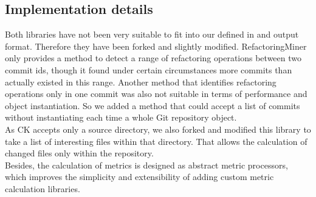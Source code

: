 \subsection{Implementation details}
Both libraries have not been very suitable to fit into our defined in and output format. Therefore they have been forked and slightly modified. RefactoringMiner only provides a method to detect a range of refactoring operations between two commit ids, though it found under certain circumstances more commits than actually existed in this range. Another method that identifies refactoring operations only in one commit was also not suitable in terms of performance and object instantiation. So we added a method that could accept a list of commits without instantiating each time a whole Git repository object. \\
As CK accepts only a source directory, we also forked and modified this library to take a list of interesting files within that directory. That allows the calculation of changed files only within the repository.\\
Besides, the calculation of metrics is designed as abstract metric processors, which improves the simplicity and extensibility of adding custom metric calculation libraries.